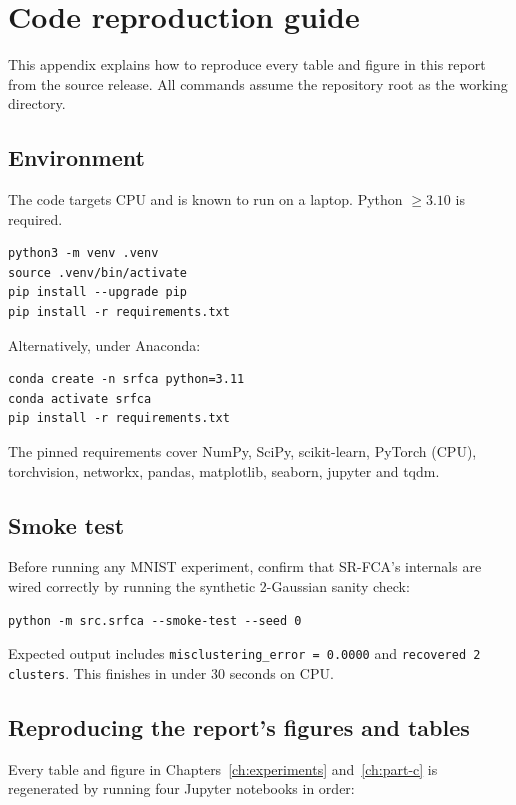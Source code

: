 \chapter{Code reproduction guide}\label{ch:appendix-user-guide}

This appendix explains how to reproduce every table and figure in this report from the source release. All commands assume the repository root as the working directory.

\section*{Environment}

The code targets CPU and is known to run on a laptop. Python $\ge 3.10$ is required.

\begin{verbatim}
python3 -m venv .venv
source .venv/bin/activate
pip install --upgrade pip
pip install -r requirements.txt
\end{verbatim}

Alternatively, under Anaconda:
\begin{verbatim}
conda create -n srfca python=3.11
conda activate srfca
pip install -r requirements.txt
\end{verbatim}

The pinned requirements cover NumPy, SciPy, scikit-learn, PyTorch (CPU), torchvision, networkx, pandas, matplotlib, seaborn, jupyter and tqdm.

\section*{Smoke test}

Before running any MNIST experiment, confirm that SR-FCA's internals are wired correctly by running the synthetic 2-Gaussian sanity check:

\begin{verbatim}
python -m src.srfca --smoke-test --seed 0
\end{verbatim}

Expected output includes \texttt{misclustering\_error = 0.0000} and \texttt{recovered 2 clusters}. This finishes in under 30 seconds on CPU.

\section*{Reproducing the report's figures and tables}

Every table and figure in Chapters~\ref{ch:experiments} and~\ref{ch:part-c} is regenerated by running four Jupyter notebooks in order:

